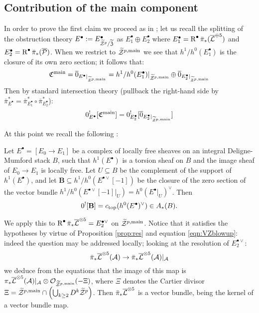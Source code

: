 \subsection{Contribution of the main component}
In order to prove the first claim we proceed as in \cite[\S5]{CL-pfields}; let us recall the splitting of the obstruction theory $E^{\bullet}:=E^{\bullet}_{\widetilde{\mathcal Z}^p/\widetilde{\mathfrak Z}}$ as $E^{\bullet}_1\oplus E^{\bullet}_2$ where $E^{\bullet}_1=\operatorname{R}^{\bullet}\bar\pi_*(\overline{\mathcal{L}}^{\oplus 5})$ and $E^{\bullet}_2=\operatorname{R}^{\bullet}\bar\pi_*(\overline{\mathcal P})$. When we restrict to $\widetilde{\mathcal Z}^{p,\rm{main}}$ we see that $h^1/h^0(E^{\bullet}_1)$ is the closure of its own zero section; it follows that:
\[
 \mathfrak C^{\rm{main}}=\overline{0}_{E^{\bullet}\rvert_{\widetilde{\mathcal Z}^{p,\rm{main}}}}=h^1/h^0(E^{\bullet}_1)\rvert_{\widetilde{\mathcal Z}^{p,\rm{main}}}\oplus \overline{0}_{E^{\bullet}_2\rvert_{\widetilde{\mathcal Z}^{p,\rm{main}}}}
\]
Then by standard intersection theory (pullback the right-hand side by $\bar\pi_{E^{\bullet}}^*=\bar\pi_{E^{\bullet}_1}^*\circ\bar\pi_{E^{\bullet}_2}^*$):
\[
 0^!_{E^{\bullet}}[\mathfrak C^{\rm{main}}]=0_{E^{\bullet}_2}^![\overline{0}_{E^{\bullet}_2\rvert_{\widetilde{\mathcal Z}^{p,\rm{main}}}}]
\]

At this point we recall the following \cite[Lemma 5.3]{CL-pfields}:
\begin{lem}
Let $E^{\bullet}=[E_0\to E_1]$ be a complex of locally free sheaves on an integral Deligne-Mumford stack $B$, such that
$h^1(E^{\bullet})$ is a torsion sheaf on $B$ and the image sheaf of $E_0\to E_1$ is locally free.
Let $U\subseteq B$ be the complement of the support of $h^1(E^{\bullet})$, and let $\mathbf{B}\subseteq h^1/h^0(E^{\bullet\vee}[-1])$
be the closure of the zero section  of the vector bundle $h^1/h^0(E^{\bullet\vee}[-1]|_U)= h^0(E^{\bullet}|_U)^\vee$. Then
$$0^![\mathbf{B}]=c_{\rm{top}}(h^0(E^{\bullet})^\vee)\in A_*(B).
$$
\end{lem}

We apply this to $\operatorname{R}^{\bullet}\bar{\pi}_*\overline{\mathcal{L}}^{\otimes 5}=E^{\bullet\vee}_2$ on $\widetilde{\mathcal Z}^{p,\rm{main}}$. Notice that it satisfies the hypotheses by virtue of Proposition \ref{prop:res} and equation \eqref{eqn:VZblowup}: indeed the question may be addressed locally; looking at the resolution of $E^{\bullet\vee}_2$:
\[
 \bar\pi_*\overline{\mathcal{L}}^{\otimes 5}(\mathcal A)\rightarrow \bar\pi_*\overline{\mathcal{L}}^{\otimes 5}(\mathcal A)\rvert_{\mathcal A}
\]
we deduce from the equations that the image of this map is $\pi_*\overline{\mathcal{L}}^{\otimes 5}(\mathcal A)\rvert_{\mathcal A}\otimes\mathcal{O}_{\widetilde{\mathcal Z}^{p,\rm{main}}}(-\Xi)$, where $\Xi$ denotes the Cartier divisor $\Xi=\widetilde{\mathcal Z}^{p,\rm{main}}\cap\left(\bigcup_{k\geq 2}D^k\widetilde{\mathcal Z}^p\right)$. Then $\bar\pi_*\overline{\mathcal{L}}^{\otimes 5}$ is a vector bundle, being the kernel of a vector bundle map.

